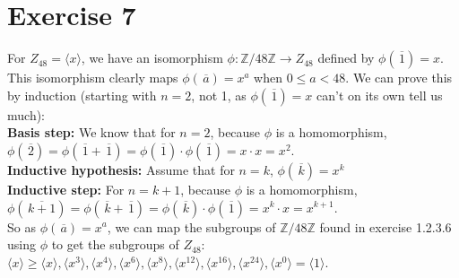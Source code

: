 \documentclass[12pt]{article}
\newcommand{\Z}{\mathbb{Z}}
\newcommand{\olsi}[1]{\,\overline{\!{#1}}}
\begin{document}
    \section*{Exercise 7}
    For $Z_{48} = \langle x \rangle$,
    we have an isomorphism $\phi: \Z/48\Z \to Z_{48}$
    defined by $\phi(\olsi{1}) = x$. \\
    This isomorphism clearly maps $\phi(\olsi{a}) = x^a$
    when $0 \leqslant a < 48$.
    We can prove this by induction
    (starting with $n = 2$, not 1, as
    $\phi(\olsi{1}) = x$ can't on its own tell us much): \\
    \textbf{Basis step:}
    We know that for $n = 2$,
    because $\phi$ is a homomorphism,
    $\phi(\olsi{2}) = \phi(\olsi{1} + \olsi{1})
    = \phi(\olsi{1}) \cdot \phi(\olsi{1}) = x \cdot x = x^2$. \\
    \textbf{Inductive hypothesis:}
    Assume that for $n = k$, $\phi(\olsi{k}) = x^k$ \\ 
    \textbf{Inductive step:}
    For $n = k + 1$, because $\phi$ is a homomorphism,
    $\phi(\olsi{k + 1}) = \phi(\olsi{k} + \olsi{1})
    = \phi(\olsi{k}) \cdot \phi(\olsi{1}) = x^k \cdot x = x^{k+1}$. \\
    So as $\phi(\olsi{a}) = x^a$,
    we can map the subgroups of $\Z/48\Z$ found in exercise 1.2.3.6
    using $\phi$ to get the subgroups of $Z_48$: \\
    $\langle x \rangle \geqslant
    \langle x \rangle,
    \langle x^3 \rangle,
    \langle x^4 \rangle,
    \langle x^6 \rangle,
    \langle x^8 \rangle,
    \langle x^{12} \rangle,
    \langle x^{16} \rangle,
    \langle x^{24} \rangle,
    \langle x^0 \rangle = \langle 1 \rangle$.
    
\end{document}
